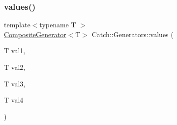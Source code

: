 \subsubsection{\texorpdfstring{values()}{values()}\hspace{0.1cm}{\footnotesize\ttfamily [3/3]}}
{\footnotesize\ttfamily template$<$typename T $>$ \\
\mbox{\hyperlink{class_catch_1_1_composite_generator}{Composite\+Generator}}$<$T$>$ Catch\+::\+Generators\+::values (\begin{DoxyParamCaption}\item[{T}]{val1,  }\item[{T}]{val2,  }\item[{T}]{val3,  }\item[{T}]{val4 }\end{DoxyParamCaption})}

